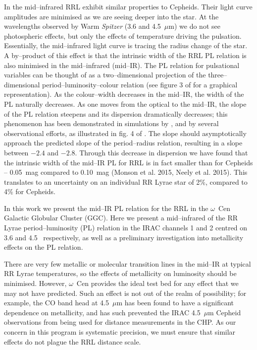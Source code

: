 \documentclass[a4paper,fleqn,usenatbib]{mnras}
\begin{document}
In the mid--infrared RRL exhibit similar properties to Cepheids\citep{2013ApJ...776..135M}. Their light curve amplitudes are minimised as we are seeing deeper into the star. At the wavelengths observed by Warm \textit{Spitzer} (3.6 and 4.5~$\mu$m) we do not see photospheric effects, but only the effects of temperature driving the pulsation. Essentially, the mid--infrared light curve is tracing the radius change of the star. A by--product of this effect is that the intrinsic width of the RRL PL relation is also minimised in the mid--infrared (mid--IR). The PL relation for pulsational variables can be thought of as a two--dimensional projection of the three--dimensional period--luminosity--colour relation (see figure 3 of \citet{1991PASP..103..933M} for a graphical representation). As the colour--width decreases in the mid--IR, the width of the PL naturally decreases. As one moves from the optical to the mid--IR, the slope of the PL relation steepens and its dispersion dramatically decreases; this phenomenon has been demonstrated in simulations by \citet{2004ApJS..154..633C}, and by several observational efforts, as illustrated in fig. 4 of \citet{2013ApJ...776..135M}. The slope should asymptotically approach the predicted slope of the period--radius relation, resulting in a slope between $-2.4$ and $-2.8$. Through this decrease in dispersion we have found that the intrinsic width of the mid--IR PL for RRL is in fact smaller than for Cepheids -- 0.05~mag compared to 0.10~mag (Monson et al. 2015, Neely et al. 2015). This translates to an uncertainty on an individual RR Lyrae star of 2\%, compared to 4\% for Cepheids. 

In this work we present the mid--IR PL relation for the RRL in the $\omega$~Cen Galactic Globular Cluster (GGC). 
Here we present a mid--infrared of the RR Lyrae period--luminosity (PL) relation in the IRAC channels 1 and 2 centred on 3.6 and 4.5 \micron\ respectively, as well as a preliminary investigation into metallicity effects on the PL relation.

There are very few metallic or molecular transition lines in the mid--IR at typical RR Lyrae temperatures, so the effects of metallicity on luminosity should be minimised. However, $\omega$~Cen provides the ideal test bed for any effect that we may not have predicted. Such an effect is not out of the realm of possibility; for example, the CO band head at 4.5~$\mu$m has been found to have a significant dependence on metallicity, and has such prevented the IRAC 4.5~$\mu$m Cepheid observations from being used for distance measurements in the CHP. As our concern in this program is systematic precision, we must ensure that similar effects do not plague the RRL distance scale.  
\end{document}
